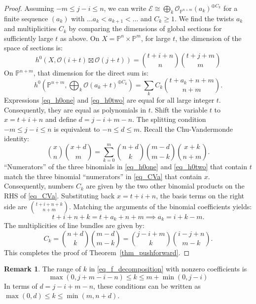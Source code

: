 \documentclass{article}
\newcommand{\mcO}{\mathcal{O}}
\newcommand{\PP}{\mathbb{P}}
\theoremstyle{definition}
\newtheorem{remark}[thm]{Remark}
\theoremstyle{definition}
\begin{document}
\begin{proof}
\noindent Assuming $-m \le j - i \le n$, we can write $\mathcal{E} \cong \bigoplus_k \mcO_{\PP^{n+m}}(a_k)^{\oplus C_k}$ for a finite sequence $(a_k)$ with $\dots a_k < a_{k+1} < \dots$ and $C_k\ge 1$. We find the twists $a_k$ and multiplicities $C_k$ by comparing the dimensions of global sections for sufficiently large $t$ as above.
On $X = \PP^n \times \PP^m$, for large $t$, the dimension of the space of sections is:
\begin{equation}\label{eq_h0one}
h^0(X, \mcO(i+t) \boxtimes \mcO(j+t)) = \binom{t+i+n}{n}\binom{t+j+m}{m}
\end{equation}
On $\PP^{n+m}$, that dimension for the direct sum is:
\begin{equation}\label{eq_h0two}
h^0\left(\PP^{n+m}, \bigoplus_k \mcO(a_k + t)^{\oplus C_k}\right) = \sum_k C_k \binom{t + a_k + n + m}{n+m}.
\end{equation}
Expressions \eqref{eq_h0one} and \eqref{eq_h0two} are equal for all large integer $t$. Consequently, they are equal as polynomials in $t$. Shift the variable $t$ to  $x = t+i+n$ and define  $d = j - i + m - n$. The splitting condition $-m \le j-i \le n$ is equivalent to $-n \le d \le m$. Recall the Chu-Vandermonde identity:
\begin{equation}\label{eq_CVa}
\binom{x}{n}\binom{x+d}{m} = \sum_{k=0}^m \binom{n+d}{k}\binom{m-d}{m-k}\binom{x+k}{n+m}.
\end{equation}
``Numerators'' of the three binomials in \eqref{eq_h0one} and \eqref{eq_h0two} that contain $t$ match the three binomial ``numerators'' in \eqref{eq_CVa} that contain $x$.
Consequently, numbers $C_k$ are given by the two other binomial products on the RHS of \eqref{eq_CVa}.
Substituting back $x = t+i+n$, the basis terms on the right side are $\binom{t+i+n+k}{n+m}$. Matching the arguments of the binomial coefficients yields:
$$t + i + n + k = t + a_k + n + m \implies a_k = i + k - m.$$
The multiplicities of line bundles are given by:
$$C_k = \binom{n+d}{k}\binom{m-d}{m-k} = \binom{j-i+m}{k}\binom{i-j+n}{m-k}.$$
This completes the proof of Theorem~\ref{thm_pushforward}.
\end{proof}

\begin{remark}
    The range of $k$ in \eqref{eq_f_decomposition} with nonzero coefficients is
$$\max(0, j +m - i - n) \le k \le m + \min(0, j - i)$$
In terms of $d = j - i + m - n$, these conditions can be written as
$\max(0,d)\le k\le \min(m,n+d)$.
\end{remark}
\end{document}
